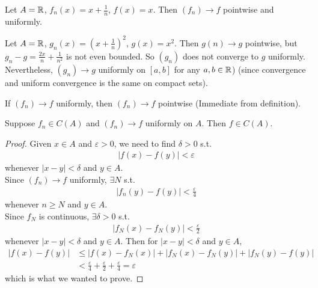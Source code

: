 \documentclass[a4paper]{article}
\begin{document}
\begin{eg}
Let $A = \mathbb{R}$, $f_n\left(x\right) = x+ \frac{1}{n}$, $f\left(x\right) = x$. Then $\left(f_n\right) \to f$ pointwise and uniformly.
\end{eg}

\begin{eg}
Let $A = \mathbb{R}$, $g_n\left(x\right) = \left(x+\frac{1}{n}\right)^2$, $g\left(x\right) = x^2$. Then $g\left(n\right) \to g$ pointwise, but $g_n-g = \frac{2x}{n}+\frac{1}{n^2}$ is not even bounded. So $\left(g_n\right)$ does not converge to $g$ uniformly. Nevertheless, $\left(g_n\right) \to g$ uniformly on $\left[a,b\right]$ for any $a,b\in \mathbb{R}$) (since convergence and uniform convergence is the same on compact sets).
\end{eg}

\begin{eg}
If $\left(f_n\right) \to f$ uniformly, then $\left(f_n\right) \to f$ pointwise (Immediate from definition).
\end{eg}

\begin{thm}
Suppose $f_n \in C\left(A\right)$ and $\left(f_n\right) \to f$ uniformly on $A$. Then $f \in C\left(A\right)$.

\begin{proof}
Given $x \in A$ and $\varepsilon > 0$, we need to find $\delta > 0$ s.t.
\begin{equation*}
\begin{aligned}
\left|f\left(x\right) - f\left(y\right) \right| < \varepsilon
\end{aligned}
\end{equation*}
whenever $\left|x-y\right| < \delta$ and $y \in A$.\\
Since $\left(f_n\right) \to f$ uniformly, $\exists N$ s.t.
\begin{equation*}
\begin{aligned}
\left|f_n\left(y\right) - f\left(y\right)\right| < \frac{\varepsilon}{4}
\end{aligned}
\end{equation*}
whenever $n \geq N$ and $y \in A$.\\
Since $f_N$ is continuous, $\exists \delta > 0$ s.t.
\begin{equation*}
\begin{aligned}
\left|f_N\left(x\right) - f_N\left(y\right) \right| < \frac{\varepsilon}{2}
\end{aligned}
\end{equation*}
whenever $\left|x-y\right| < \delta$ and $y \in A$. Then for $|x-y| < \delta$ and $y \in A$,
\begin{equation*}
\begin{aligned}
\left|f\left(x\right)-f\left(y\right)\right| &\leq \left|f\left(x\right)-f_N\left(x\right)\right| + \left|f_N\left(x\right)-f_N\left(y\right)\right| + \left|f_N\left(y\right) - f\left(y\right) \right|\\
&<\frac{\varepsilon}{4} + \frac{\varepsilon}{2} + \frac{\varepsilon}{4} = \varepsilon
\end{aligned}
\end{equation*}
which is what we wanted to prove.
\end{proof}
\end{thm}
\end{document}
